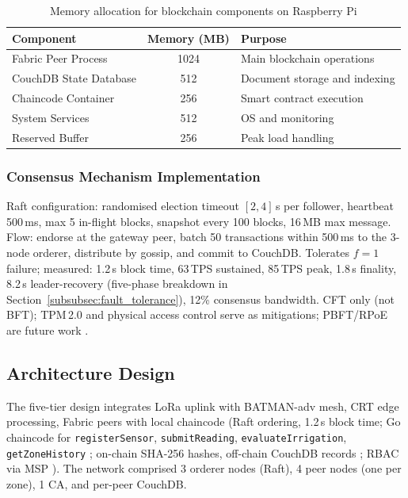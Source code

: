 \documentclass[pdflatex,sn-mathphys-num]{sn-jnl}
\theoremstyle{thmstyleone}
\theoremstyle{thmstyletwo}
\theoremstyle{thmstylethree}
\begin{document}
\begin{table}[htbp]
\centering
\caption{Memory allocation for blockchain components on Raspberry Pi}
\label{tab:memory-allocation}
\scriptsize
\setlength{\tabcolsep}{3pt}
\begin{tabularx}{\columnwidth}{l c X}
\toprule
\textbf{Component} & \textbf{Memory (MB)} & \textbf{Purpose} \\
\midrule
Fabric Peer Process       & 1024 & Main blockchain operations \\
CouchDB State Database    & 512  & Document storage and indexing \\
Chaincode Container       & 256  & Smart contract execution \\
System Services           & 512  & OS and monitoring \\
Reserved Buffer           & 256  & Peak load handling \\
\bottomrule
\end{tabularx}
\end{table}

\subsubsection{Consensus Mechanism Implementation}
\label{subsubsec:consensus_details}

Raft configuration: randomised election timeout $[2,4]$\,s per follower, heartbeat 500\,ms, max 5 in-flight blocks, snapshot every 100 blocks, 16\,MB max message. Flow: endorse at the gateway peer, batch 50 transactions within 500\,ms to the 3-node orderer, distribute by gossip, and commit to CouchDB. Tolerates $f=1$ failure; measured: 1.2\,s block time, 63\,TPS sustained, 85\,TPS peak, 1.8\,s finality, 8.2\,s leader-recovery (five-phase breakdown in Section~\ref{subsubsec:fault_tolerance}), 12\% consensus bandwidth. CFT only (not BFT); TPM\,2.0 and physical access control serve as mitigations; PBFT/RPoE are future work \cite{rbcet2025,rpoe2026,abishu2021consensus}.

\subsection{Architecture Design}
\label{subsec:architecture_design}

The five-tier design \cite{gubbi2013internet, christidis2016blockchain} integrates LoRa uplink with BATMAN-adv mesh, CRT edge processing, Fabric peers with local chaincode (Raft ordering, 1.2\,s block time; Go chaincode for \texttt{registerSensor}, \texttt{submitReading}, \texttt{evaluateIrrigation}, \texttt{getZoneHistory} \cite{orderingServiceDoc}; on-chain SHA-256 hashes, off-chain CouchDB records \cite{privateDataDoc}; RBAC via MSP \cite{mdpiAccessControl}). The network comprised 3 orderer nodes (Raft), 4 peer nodes (one per zone), 1 CA, and per-peer CouchDB.
\end{document}
